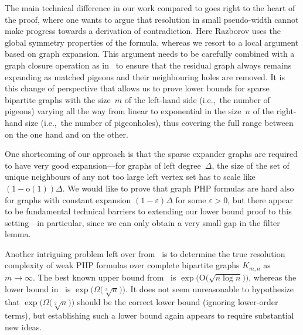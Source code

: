 \documentclass{article}
\newcommand{\Bigoh}[1]{\mathrm{O} \bigl( #1 \bigr)}
\newcommand{\littleoh}[1]{\mathrm{o} ( #1 )}
\newcommand{\Bigomega}[1]{\Omega \bigl( #1 \bigr)}
\newcommand{\ie}{i.e.,\ }
\newcommand{\GdegMax}{\Delta}
\newcommand{\gdegmax}{\GdegMax}
\newcommand{\pseudowidth}{pseudo-width\xspace}
\numberwithin{equation}{section}
\begin{document}
The main technical difference in our work compared to
\cite{Razborov04ResolutionLowerBoundsPM,Razborov03ResolutionLowerBoundsWFPHP} 
goes right to the heart of the proof, where one wants to argue that
resolution in small \pseudowidth cannot make progress towards a
derivation of contradiction. Here Razborov uses the global symmetry
properties of the formula, whereas we resort to a local argument based on
graph expansion. This argument needs to be carefully combined with a
graph closure operation as 
in~\cite{ABRW04Pseudorandom,AR03LowerBounds} to ensure that the
residual graph always remains expanding as matched pigeons and their
neighbouring holes are removed. It is this change of perspective that
allows us to prove lower bounds for sparse bipartite graphs
with the size~$m$ of the left-hand side (\ie the number of pigeons)
varying all the way from linear to exponential in the size~$n$ of the
right-hand size (\ie the number of pigeonholes),
thus covering the full range between
\cite{BW01ShortProofs} on the one hand and
\cite{Raz04Resolution,Razborov04ResolutionLowerBoundsPM,Razborov03ResolutionLowerBoundsWFPHP}
on the other.



One shortcoming of our approach is that the sparse expander graphs are
required to have very good expansion---for graphs of left
degree~$\gdegmax$, the size of the set of unique neighbours of any not
too large left vertex set has to scale like
$(1 - \littleoh{1})\gdegmax$.  We would like to prove that graph PHP
formulas are hard also for graphs with constant expansion
$(1 - \varepsilon)\gdegmax$ for some $\varepsilon > 0$, but there
appear to be fundamental technical barriers to extending our lower
bound proof to this setting---in particular, since we can only obtain
a very small gap in the filter lemma.

Another intriguing problem left over
from~\cite{Razborov04ResolutionLowerBoundsPM} 
is to determine the true resolution complexity of weak PHP formulas
over complete bipartite graphs
$K_{m,n}$ as $m \to \infty$.
The best known upper  bound from~\cite{BP97Weak}
is
$\exp \bigr( \Bigoh{\sqrt{n \log n}} \bigr)$,
whereas the lower bound 
in~\cite{Razborov04ResolutionLowerBoundsPM,Razborov03ResolutionLowerBoundsWFPHP}
is
$\exp \bigl( \Bigomega{\sqrt[3]{n}} \bigr)$.
It does not seem unreasonable to hypothesize that 
$\exp \bigl( \Bigomega{\sqrt[2]{n}} \bigr)$
should be the correct lower bound (ignoring lower-order terms), but
establishing such a lower bound again appears to require substantial
new ideas.
\end{document}
